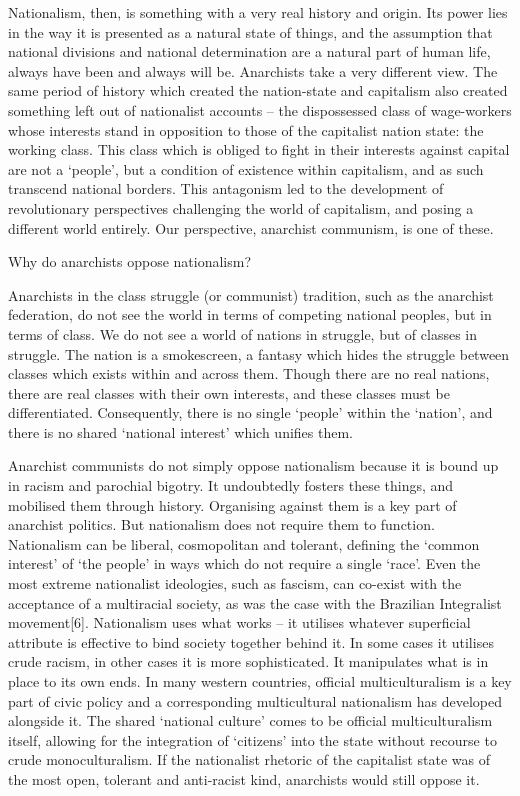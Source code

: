Nationalism, then, is something with a very real history and origin. Its power lies in the way it is presented as a natural state of things, and the assumption that national divisions and national determination are a natural part of human life, always have been and always will be. Anarchists take a very different view. The same period of history which created the nation-state and capitalism also created something left out of nationalist accounts – the dispossessed class of wage-workers whose interests stand in opposition to those of the capitalist nation state: the working class. This class which is obliged to fight in their interests against capital are not a ‘people’, but a condition of existence within capitalism, and as such transcend national borders. This antagonism led to the development of revolutionary perspectives challenging the world of capitalism, and posing a different world entirely. Our perspective, anarchist communism, is one of these.

Why do anarchists oppose nationalism?

Anarchists in the class struggle (or communist) tradition, such as the anarchist federation, do not see the world in terms of competing national peoples, but in terms of class. We do not see a world of nations in struggle, but of classes in struggle. The nation is a smokescreen, a fantasy which hides the struggle between classes which exists within and across them. Though there are no real nations, there are real classes with their own interests, and these classes must be differentiated. Consequently, there is no single ‘people’ within the ‘nation’, and there is no shared ‘national interest’ which unifies them.

Anarchist communists do not simply oppose nationalism because it is bound up in racism and parochial bigotry. It undoubtedly fosters these things, and mobilised them through history. Organising against them is a key part of anarchist politics. But nationalism does not require them to function. Nationalism can be liberal, cosmopolitan and tolerant, defining the ‘common interest’ of ‘the people’ in ways which do not require a single ‘race’. Even the most extreme nationalist ideologies, such as fascism, can co-exist with the acceptance of a multiracial society, as was the case with the Brazilian Integralist movement[6]. Nationalism uses what works – it utilises whatever superficial attribute is effective to bind society together behind it. In some cases it utilises crude racism, in other cases it is more sophisticated. It manipulates what is in place to its own ends. In many western countries, official multiculturalism is a key part of civic policy and a corresponding multicultural nationalism has developed alongside it. The shared ‘national culture’ comes to be official multiculturalism itself, allowing for the integration of ‘citizens’ into the state without recourse to crude monoculturalism. If the nationalist rhetoric of the capitalist state was of the most open, tolerant and anti-racist kind, anarchists would still oppose it.

